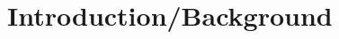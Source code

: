 \documentclass[../mthe-493-project-proposal]{subfiles}
\begin{document}
    \chapter{Introduction/Background}
    \label{ch:introduction}

    \Blindtext
\end{document}

